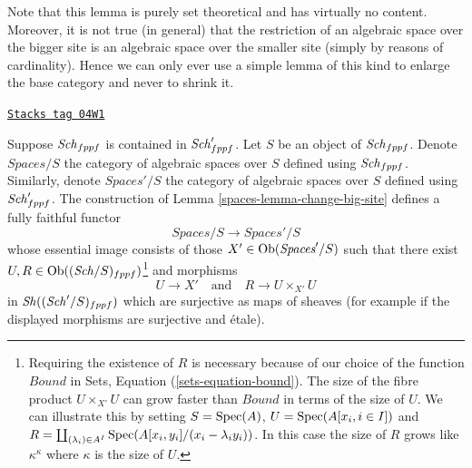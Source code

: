 Note that this lemma is purely set theoretical and has virtually no content.
Moreover, it is not true (in general) that the restriction of an algebraic
space over the bigger site is an algebraic space over the smaller site (simply
by reasons of cardinality). Hence we can only ever use a simple lemma of this
kind to enlarge the base category and never to shrink it.

\begin{lemma}
\label{spaces-lemma-fully-faithful}
\href{https://stacks.math.columbia.edu/tag/04W1}{\texttt{Stacks tag 04W1}}

Suppose $\mathit{Sch}_{fppf}$ is contained in $\mathit{Sch}'_{fppf}$.
Let $S$ be an object of $\mathit{Sch}_{fppf}$. Denote
$\textit{Spaces}/S$ the category of algebraic spaces over $S$
defined using $\mathit{Sch}_{fppf}$. Similarly, denote
$\textit{Spaces}'/S$ the category of algebraic spaces over $S$
defined using $\mathit{Sch}'_{fppf}$. The construction of
Lemma \ref{spaces-lemma-change-big-site}
defines a fully faithful functor
$$
\textit{Spaces}/S \longrightarrow \textit{Spaces}'/S
$$
whose essential image consists of those $X' \in \operatorname{Ob}(\textit{Spaces}'/S)$
such that there exist $U, R \in \operatorname{Ob}((\mathit{Sch}/S)_{fppf})$\footnote{Requiring the
existence of $R$ is necessary because of our choice of the function $Bound$ in
Sets, Equation (\ref{sets-equation-bound}). The size of the fibre product
$U \times_{X'} U$ can grow faster than $Bound$ in terms of the size of $U$. We
can illustrate this by setting $S = \operatorname{Spec}(A)$, $U = \operatorname{Spec}(A[x_i, i \in I])$ and
$R = \coprod_{(\lambda_i) \in A^I} \operatorname{Spec}(A[x_i, y_i]/(x_i - \lambda_i y_i))$.
In this case the size of $R$ grows like $\kappa^\kappa$ where $\kappa$ is the
size of $U$.} and morphisms
$$
U \longrightarrow X'
\quad\text{and}\quad
R \longrightarrow U \times_{X'} U
$$
in $\mathit{Sh}((\mathit{Sch}'/S)_{fppf})$ which are surjective as maps of sheaves
(for example if the displayed morphisms are surjective and \'etale).
\end{lemma}

